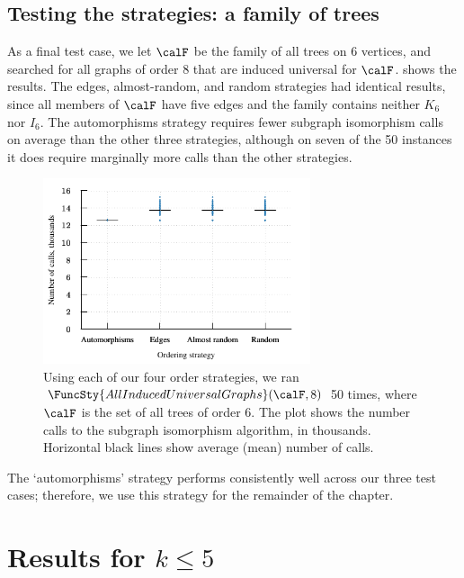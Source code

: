 \subsection{Testing the strategies: a family of trees}

As a final test case, we let $\calF$ be the family of all trees on 6 vertices,
and searched for all graphs of order 8 that are induced universal for $\calF$.
 shows the results. The edges, almost-random,
and random strategies had identical results, since all members of $\calF$ have five
edges and the family contains neither $K_6$ nor $I_6$.  The automorphisms strategy
requires fewer subgraph isomorphism calls on average than the other three strategies,
although on seven of the 50 instances it does require marginally more calls than
the other strategies.

\begin{figure}[htb]
    \centering

    \includegraphics*[width=0.7\textwidth]{15-universal-graphs/img/second-experiment-plot-using-trees}

    \caption{Using each of our four order strategies, we ran
        $\FuncSty{AllInducedUniversalGraphs}(\calF,8)$ 50 times, where
        $\calF$ is the set of all trees of order 6. The plot
        shows the number calls to the subgraph isomorphism algorithm, in thousands.
        Horizontal black lines show average (mean) number of calls.}
\label{fig:second-experiment-using-trees}
\end{figure}

The `automorphisms' strategy performs consistently well across our three test
cases; therefore, we use this strategy for the remainder of the chapter.

\section{Results for \texorpdfstring{$k \leq 5$}{k<=5}}\label{sec:results5}

